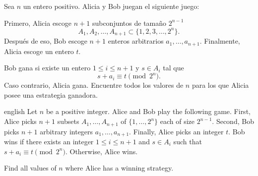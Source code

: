 \begin{problem}[Nordic 2021/3]
	Sea $n$ un entero positivo. Alicia y Bob juegan el siguiente juego:
	\begin{itemize}
		\ii Primero, Alicia escoge $n+1$ subconjuntos de tamaño $2^{n-1}$
		\[A_1,A_2,\dots,A_{n+1}\subset\{1,2,3,\dots,2^n\}.\]
		\ii Después de eso, Bob escoge $n+1$ enteros arbitrarios $a_1,\dots,a_{n+1}$.
		\ii Finalmente, Alicia escoge un entero $t$.
	\end{itemize}
	Bob gana si existe un entero $1\le i\le n+1$ y $s\in A_i$ tal que
	\[s+a_i\equiv t\pmod{2^n}.\]
	Caso contrario, Alicia gana. Encuentre todos los valores de $n$ para los que Alicia posee una estrategia ganadora.
	\begin{hint}
		\begin{otherlanguage*}{english}
			Let $n$ be a positive integer. Alice and Bob play the following game. First, Alice picks $n+1$ subsets $A_1,\dots,A_{n+1}$ of $\{1,\dots,2^n\}$ each of size $2^{n-1}$. Second, Bob picks $n+1$ arbitrary integers $a_1,\dots,a_{n+1}$. Finally, Alice picks an integer $t$. Bob wins if there exists an integer $1\le i\le n+1$ and $s\in A_i$ such that $s+a_i\equiv t\pmod{2^n}$. Otherwise, Alice wins.

			Find all values of $n$ where Alice has a winning strategy.
		\end{otherlanguage*}
	\end{hint}
\end{problem}
